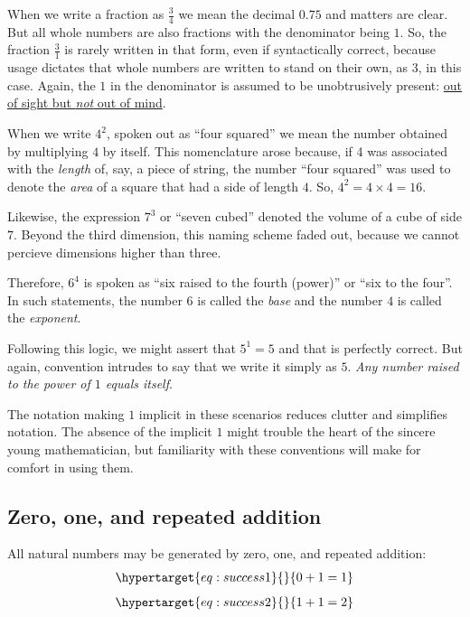 \documentclass[
  a4paper,
]{article}
\begin{document}
When we write a fraction as \(\frac{3}{4}\) we mean the decimal \(0.75\)
and matters are clear. But all whole numbers are also fractions with the
denominator being \(1\). So, the fraction \(\frac{3}{1}\) is rarely
written in that form, even if syntactically correct, because usage
dictates that whole numbers are written to stand on their own, as \(3\),
in this case. Again, the \(1\) in the denominator is assumed to be
unobtrusively present:
\href{https://dictionary.cambridge.org/dictionary/english/out-of-sight-out-of-mind}{out
of sight but \emph{not} out of mind}.

When we write \(4^2\), spoken out as ``four squared'' we mean the number
obtained by multiplying \(4\) by itself. This nomenclature arose
because, if 4 was associated with the \emph{length} of, say, a piece of
string, the number ``four squared'' was used to denote the \emph{area}
of a square that had a side of length \(4\). So,
\(4^2 = 4\times4 = 16\).

Likewise, the expression \(7^3\) or ``seven cubed'' denoted the volume
of a cube of side \(7\). Beyond the third dimension, this naming scheme
faded out, because we cannot percieve dimensions higher than three.

Therefore, \(6^4\) is spoken as ``six raised to the fourth (power)'' or
``six to the four''. In such statements, the number \(6\) is called the
\emph{base} and the number \(4\) is called the \emph{exponent}.

Following this logic, we might assert that \(5^1 = 5\) and that is
perfectly correct. But again, convention intrudes to say that we write
it simply as \(5\). \emph{Any number raised to the power of \(1\) equals
itself}.

The notation making \(1\) implicit in these scenarios reduces clutter
and simplifies notation. The absence of the implicit \(1\) might trouble
the heart of the sincere young mathematician, but familiarity with these
conventions will make for comfort in using them.

\hypertarget{zero-one-and-repeated-addition}{%
\subsection{Zero, one, and repeated
addition}\label{zero-one-and-repeated-addition}}

All natural numbers may be generated by zero, one, and repeated
addition: \begin{equation}\protect\hypertarget{eq:success1}{}{
\begin{aligned}
0 + 1 = 1
\end{aligned}
}\label{eq:success1}\end{equation}
\begin{equation}\protect\hypertarget{eq:success2}{}{
\begin{aligned}
1 + 1 = 2
\end{aligned}
}\label{eq:success2}\end{equation}
\end{document}
